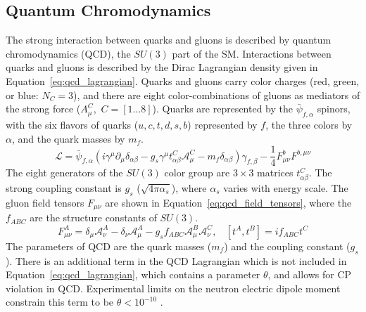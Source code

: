 
\subsection{Quantum Chromodynamics}\label{ch:sm:qcd}
The strong interaction between quarks and gluons is described by quantum chromodynamics (QCD), the $SU(3)$ part of the SM. Interactions between quarks and gluons is described by the Dirac Lagrangian density given in Equation~\ref{eq:qcd_lagrangian}. Quarks and gluons carry color charges (red, green, or blue: $N_C = 3$), and there are eight color-combinations of gluons as mediators of the strong force ($A^C_\mu$,~$C=[1...8]$). Quarks are represented by the $\bar{\psi}_{f,\alpha}$ spinors, with the six flavors of quarks ($u,c,t,d,s,b$) represented by $f$, the three colors by $\alpha$, and the quark masses by $m_f$.
\begin{equation}
    \mathcal{L}=\bar{\psi}_{f,\alpha}(i\gamma^\mu \partial_\mu \delta_{\alpha\beta}-g_s\gamma^\mu t^C_{\alpha\beta}\mathcal{A}^C_\mu-m_f\delta_{\alpha\beta})\gamma_{f,\beta}-\frac{1}{4}F^b_{\mu\nu}F^{b,\mu\nu}
    \label{eq:qcd_lagrangian}
\end{equation}
 The eight generators of the $SU(3)$ color group are $3\times 3$ matrices $t^C_{\alpha\beta}$. The strong coupling constant is $g_s$ ($\sqrt{4\pi\alpha_s}$), where $\alpha_s$ varies with energy scale.  The gluon field tensors $F_{\mu\nu}$ are shown in Equation~\ref{eq:qcd_field_tensors}, where the $f_{ABC}$ are the structure constants of $SU(3)$.
\begin{equation}
F_{\mu\nu}^A = \delta_{\mu} \mathcal{A}^A_{\nu} - \delta_{\nu} \mathcal{A}^A_\mu - g_s f_{ABC} \mathcal{A}_\mu^B \mathcal{A}_\nu^C,~~~~ [t^A, t^B] = if_{ABC}t^C
\label{eq:qcd_field_tensors}
\end{equation}
The parameters of QCD are the quark masses ($m_f$) and the coupling constant ($g_s$). There is an additional term in the QCD Lagrangian which is not included in Equation~\ref{eq:qcd_lagrangian}, which contains a parameter $\theta$, and allows for CP violation in QCD. Experimental limits on the neutron electric dipole moment constrain this term to be $\theta < 10^{-10}$ \cite{PhysRevLett.97.131801}.

